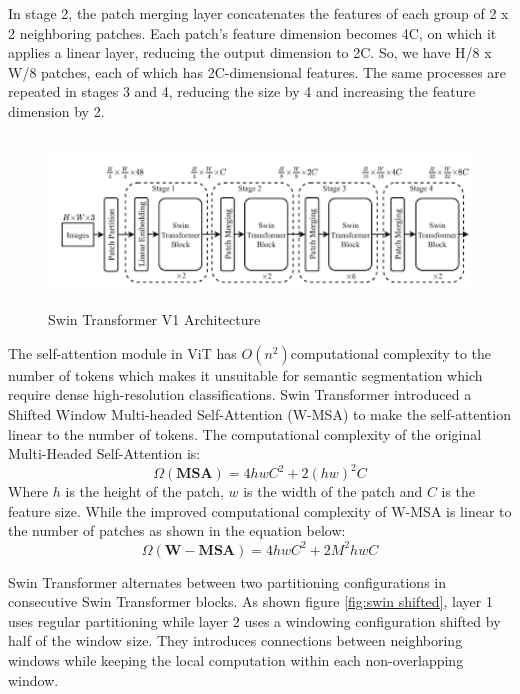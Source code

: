 In stage 2, the patch merging layer concatenates the features of each group of 2 x 2 neighboring patches. Each patch’s feature dimension becomes 4C, on which it applies a linear layer, reducing the output dimension to 2C. So, we have H/8 x W/8 patches, each of which has 2C-dimensional features. The same processes are repeated in stages 3 and 4, reducing the size by 4 and increasing the feature dimension by 2.

\FloatBarrier
\begin{figure}[ht]
\centering
\includegraphics[width=11.5cm, height=4.5cm]{images/swin-transformer-4block.png}
\caption{Swin Transformer V1 Architecture \protect\cite{swin-v1}}
\label{fig:swin architecture1}
\end{figure}

The self-attention module in ViT has $O(n^2) $computational complexity to the number of tokens which makes it unsuitable for semantic segmentation which require dense high-resolution classifications. Swin Transformer introduced a Shifted Window Multi-headed Self-Attention (W-MSA) to make the self-attention linear to the number of tokens. The computational complexity of the original Multi-Headed Self-Attention is:
\begin{equation}
    \Omega (\mathbf{MSA}) = 4hwC^2 + 2(hw)^2C
\end{equation}
Where $h$ is the height of the patch, $w$ is the width of the patch and $C$ is the feature size. While the improved computational complexity of W-MSA is linear to the number of patches as shown in the equation below:
\begin{equation}
    \Omega (\mathbf{W-MSA}) = 4hwC^2 + 2M^2hwC
\end{equation}

Swin Transformer alternates between two partitioning configurations in consecutive Swin Transformer blocks. As shown figure \ref{fig:swin shifted}, layer 1 uses regular partitioning while layer 2 uses a windowing configuration shifted by half of the window size. They introduces connections between neighboring windows while keeping the local computation within each non-overlapping window.

